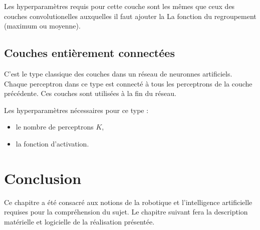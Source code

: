 Les hyperparamètres requis pour cette couche sont les mêmes que ceux des couches
convolutionelles auxquelles il faut ajouter la La fonction du regroupement
(maximum ou moyenne).

\subsection{Couches entièrement connectées}

C'est le type classique des couches dans un réseau de neuronnes artificiels.
Chaque perceptron dans ce type est connecté à tous les perceptrons de la couche
précédente. Ces couches sont utilisées à la fin du réseau.

Les hyperparamètres nécessaires pour ce type :

\begin{itemize}
  \item le nombre de perceptrons $K$,
  \item la fonction d'activation.
\end{itemize}

\section*{Conclusion}

Ce chapitre a été consacré aux notions de la robotique et l'intelligence
artificielle requises pour la compréhension du sujet. Le chapitre suivant fera
la description matérielle et logicielle de la réalisation présentée.
